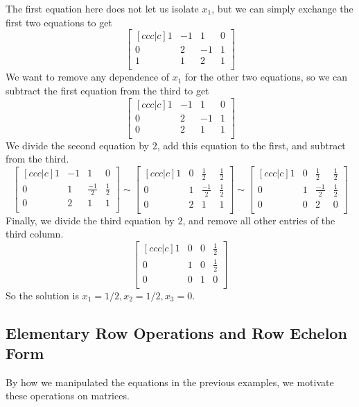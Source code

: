The first equation here does not let us isolate $x_1$, but we can simply exchange the first two equations to get \[
\begin{bmatrix}[ccc|c]
	1 & -1 & 1 & 0\\
	0&2&-1&1\\
	1& 1 & 2 & 1\\
\end{bmatrix}
\]
We want to remove any dependence of $x_1$ for the other two equations, so we can subtract the first equation from the third to get \[
	\begin{bmatrix}[ccc|c]
		1 & -1 & 1 & 0\\
		0&2&-1&1\\
		0& 2 & 1 & 1\\
	\end{bmatrix}
\]
We divide the second equation by $2$, add this equation to the first, and subtract from the third.
\[
	\begin{bmatrix}[ccc|c]
		1 & -1 & 1 & 0\\
		0&1&\frac{-1}{2}&\frac{1}{2}\\
		0& 2 & 1 & 1\\
	\end{bmatrix} \sim
	\begin{bmatrix}[ccc|c]
		1 & 0 & \frac{1}{2} & \frac{1}{2}\\
		0&1&\frac{-1}{2}&\frac{1}{2}\\
		0& 2 & 1 & 1\\
	\end{bmatrix}
	\sim
	\begin{bmatrix}[ccc|c]
		1 & 0 & \frac{1}{2} & \frac{1}{2}\\
		0&1&\frac{-1}{2}&\frac{1}{2}\\
		0& 0 & 2 & 0\\
	\end{bmatrix}
\]
Finally, we divide the third equation by $2$, and remove all other entries of the third column.
\[
	\begin{bmatrix}[ccc|c]
		1 & 0 & 0& \frac{1}{2}\\
		0&1&0&\frac{1}{2}\\
		0& 0 & 1 & 0\\
	\end{bmatrix}
\]
So the solution is $x_1=1/2, x_2=1/2, x_3=0$.
\subsection{Elementary Row Operations and Row Echelon Form}
By how we manipulated the equations in the previous examples, we motivate these operations on matrices.

